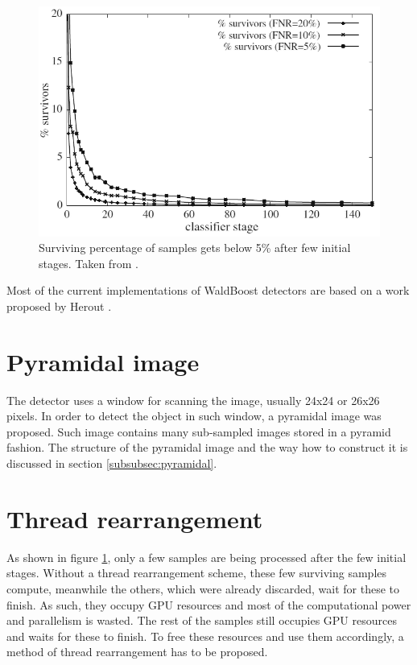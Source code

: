 \begin{center}
\begin{figure}[ht]
	\centering\includegraphics[width=0.6\linewidth]{fig/survivors.png}
	\caption{Surviving percentage of samples gets below 5\% after few initial stages. Taken from \cite{herout2011real}.}
	\label{fig:survivors}
\end{figure}
\end{center}

Most of the current implementations of WaldBoost detectors are based on a work proposed by Herout \cite{herout2011real}. 

\section{Pyramidal image}\label{subsec:anal-pyramidal}

The detector uses a window for scanning the image, usually 24x24 or 26x26 pixels. In order to detect the object in such window, a pyramidal image was proposed. Such image contains many sub-sampled images stored in a pyramid fashion. The structure of the pyramidal image and the way how to construct it is discussed in section \ref{subsubsec:pyramidal}.

\section{Thread rearrangement}\label{subsec:anal-thread-rearrangement}

As shown in figure \ref{fig:survivors}, only a few samples are being processed after the few initial stages. Without a thread rearrangement scheme, these few surviving samples compute, meanwhile the others, which were already discarded, wait for these to finish. As such, they occupy GPU resources and most of the computational power and parallelism is wasted. The rest of the samples still occupies GPU resources and waits for these to finish. To free these resources and use them accordingly, a method of thread rearrangement has to be proposed.

